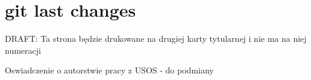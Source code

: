 \documentclass{eitidypl}
\begin{document}

\maketitle


\section*{git last changes}
\thispagestyle{empty}
DRAFT: Ta strona będzie drukowane na drugiej karty tytularnej i nie ma na niej numeracji


\cleardoublepage
{}
\setcounter{page}{1}
\makeabstracts

\cleardoublepage
Oswiadczenie o autorstwie pracy z USOS - do podmiany


\cleardoublepage
\pagestyle{fancy}
\tableofcontents

\cleardoublepage
\pagestyle{fancy}



%
%
%
\cleardoublepage
\label{bibliography}
\printbibliography[heading=bibintoc]

\clearpage
\printglossary[type=\acronymtype,title=Wykaz skrótów]
\printglossary[type=main]

\clearpage{}
\label{listoffigures}
\listoffigures
{}

\clearpage{}
\label{listoftables}
\listoftables
{}
\end{document}

